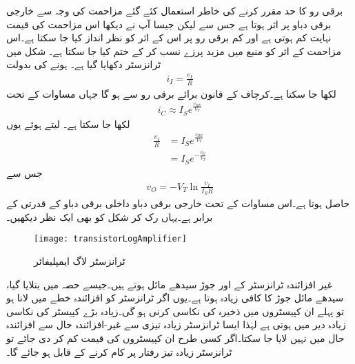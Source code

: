 برقی رو کا حد مقرر کرنے کی خاطر استعمال کئے گئے مزاحمت  کی وجہ سے خارجی برقی دباو   پر اثر ہوتا ہے جس سے  لیکن جیسا آپ نے دیکھا اس مزاحمت کی قیمت نہایت کم ہوتی ہے اور کم برقی رو پر اس کے اثر کو نظر انداز کیا جا سکتا ہے۔اس مزاحمت کے اثر کو منبع میں مزید پرزے نسب کر کے ختم کیا جا سکتا ہے۔
شکل  میں ٹرانزسٹر  دکھایا گیا ہے۔ ہونے کی بدولت
\begin{align*}
i_I=\frac{v_I}{R}
\end{align*}
لکھا جا سکتا ہے۔کرچاف کے قانون برائے برقی رو سے  ہو گا جہاں مساوات  کے تحت
\begin{align*}
i_C \approx I_S e^{\frac{v_{BE}}{V_T}}
\end{align*}
لکھا جا سکتا ہے۔ لیتے ہوئے یوں
\begin{align*}
\frac{v_I}{R}&=I_S e^{\frac{v_{BE}}{V_T}}\\
&=I_S e^{-\frac{v_{O}}{V_T}}
\end{align*}
جس سے
\begin{align}
v_O=-V_T \ln \frac{v_I}{I_S R}
\end{align}
حاصل ہوتا ہے۔اس مساوات کے تحت خارجی برقی دباو  داخلی برقی دباو کے قدرتی  کے برابر ہے۔یہاں رک کر شکل  کو بھی ایک نظر دیکھیں۔
%
\begin{figure}
\centering
\texttt{[image: transistorLogAmplifier]}
\caption{ٹرانزسٹر لاگ ایمپلیفائر}
\label{شکل_ٹرانزسٹر_لاگ_ایمپلیفائر}
\end{figure}
غیر افزائندہ ٹرانزسٹر کے  اور  جوڑ سیدھے مائل ہوتے ہیں۔جیسے حصہ  میں بتلایا گیا، سیدھے مائل  جوڑ کا  کافی زیادہ ہوتا ہے۔یوں اگر ٹرانزسٹر کو افزائندہ خطے میں لانا ہو تو پہلے ان کپیسٹروں میں ذخیرہ  کی نکاسی کرنی ہو گی۔زیادہ بڑے کپیسٹر کی نکاسی زیادہ دیر میں ہوتی ہے لہٰذا ایسا ٹرانزسٹر زیادہ تیزی سے غیر-افزائندہ حال سے افزائندہ حال میں نہیں لایا جا سکتا۔اگر کسی طرح ان کپیسٹروں کی قیمت کم کر دی جائے تو ٹرانزسٹر زیادہ تیز رفتار پر کام کرنے کے قابل ہو جائے گا۔

